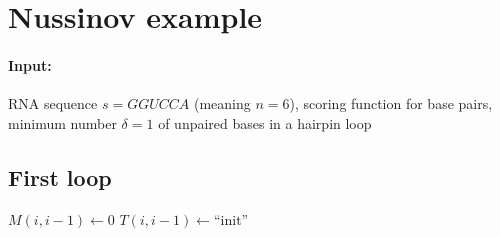 

\section{Nussinov example}\label{sec:nussinov-example}

\paragraph{Input:} RNA sequence $s = GGUCCA$ (meaning $n = 6$), scoring function for base pairs, minimum number $\delta = 1$ of unpaired bases in a hairpin loop

\subsection*{First loop} %
\begin{algorithmic}
        \State $M(i,i-1) \gets 0$
        \State $T(i,i-1) \gets \text{``init''}$ 
    \EndFor
\end{algorithmic}

